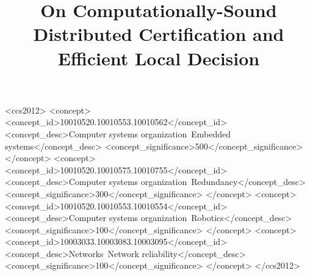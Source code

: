 \documentclass[acmsmall,nonacm,anonymous]{acmart}
\begin{document}
\title{On Computationally-Sound Distributed Certification and Efficient Local Decision}





\begin{CCSXML}
<ccs2012>
 <concept>
  <concept_id>10010520.10010553.10010562</concept_id>
  <concept_desc>Computer systems organization~Embedded systems</concept_desc>
  <concept_significance>500</concept_significance>
 </concept>
 <concept>
  <concept_id>10010520.10010575.10010755</concept_id>
  <concept_desc>Computer systems organization~Redundancy</concept_desc>
  <concept_significance>300</concept_significance>
 </concept>
 <concept>
  <concept_id>10010520.10010553.10010554</concept_id>
  <concept_desc>Computer systems organization~Robotics</concept_desc>
  <concept_significance>100</concept_significance>
 </concept>
 <concept>
  <concept_id>10003033.10003083.10003095</concept_id>
  <concept_desc>Networks~Network reliability</concept_desc>
  <concept_significance>100</concept_significance>
 </concept>
</ccs2012>
\end{CCSXML}


\end{document}
